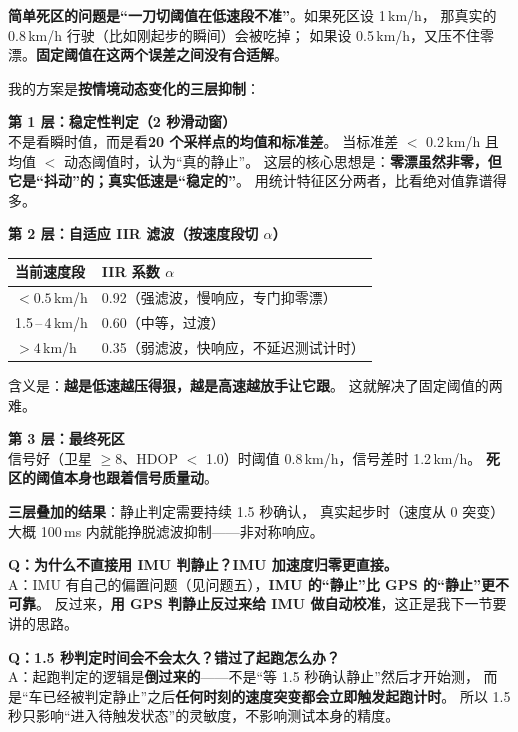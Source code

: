 \documentclass[UTF8,11pt,a4paper]{ctexart}
\begin{document}
\begin{candidate}
\textbf{简单死区的问题是``一刀切阈值在低速段不准''}。如果死区设 1\,km/h，
那真实的 0.8\,km/h 行驶（比如刚起步的瞬间）会被吃掉；
如果设 0.5\,km/h，又压不住零漂。\textbf{固定阈值在这两个误差之间没有合适解}。

\medskip
我的方案是\textbf{按情境动态变化的三层抑制}：

\medskip
\textbf{第 1 层：稳定性判定（2 秒滑动窗）}\\
不是看瞬时值，而是看\textbf{20 个采样点的均值和标准差}。
当标准差 $<$ 0.2\,km/h 且均值 $<$ 动态阈值时，认为``真的静止''。
这层的核心思想是：\textbf{零漂虽然非零，但它是``抖动''的；真实低速是``稳定的''}。
用统计特征区分两者，比看绝对值靠谱得多。

\medskip
\textbf{第 2 层：自适应 IIR 滤波（按速度段切 $\alpha$）}
\begin{center}\begin{tabular}{ll}
\toprule
当前速度段 & IIR 系数 $\alpha$ \\\midrule
$< 0.5$\,km/h     & 0.92（强滤波，慢响应，专门抑零漂）\\
1.5\,–\,4\,km/h   & 0.60（中等，过渡）\\
$> 4$\,km/h       & 0.35（弱滤波，快响应，不延迟测试计时）\\
\bottomrule
\end{tabular}\end{center}
含义是：\textbf{越是低速越压得狠，越是高速越放手让它跟}。
这就解决了固定阈值的两难。

\medskip
\textbf{第 3 层：最终死区}\\
信号好（卫星 $\ge 8$、HDOP $<$ 1.0）时阈值 0.8\,km/h，信号差时 1.2\,km/h。
\textbf{死区的阈值本身也跟着信号质量动}。

\medskip
\textbf{三层叠加的结果}：静止判定需要持续 1.5 秒确认，
真实起步时（速度从 0 突变）大概 100\,ms 内就能挣脱滤波抑制——非对称响应。
\end{candidate}

\begin{followup}
\textbf{Q：为什么不直接用 IMU 判静止？IMU 加速度归零更直接。}\\
A：IMU 有自己的偏置问题（见问题五），\textbf{IMU 的``静止''比 GPS 的``静止''更不可靠}。
反过来，\textbf{用 GPS 判静止反过来给 IMU 做自动校准}，这正是我下一节要讲的思路。

\medskip
\textbf{Q：1.5 秒判定时间会不会太久？错过了起跑怎么办？}\\
A：起跑判定的逻辑是\textbf{倒过来的}——不是``等 1.5 秒确认静止''然后才开始测，
而是``车已经被判定静止''之后\textbf{任何时刻的速度突变都会立即触发起跑计时}。
所以 1.5 秒只影响``进入待触发状态''的灵敏度，不影响测试本身的精度。
\end{followup}
\end{document}
